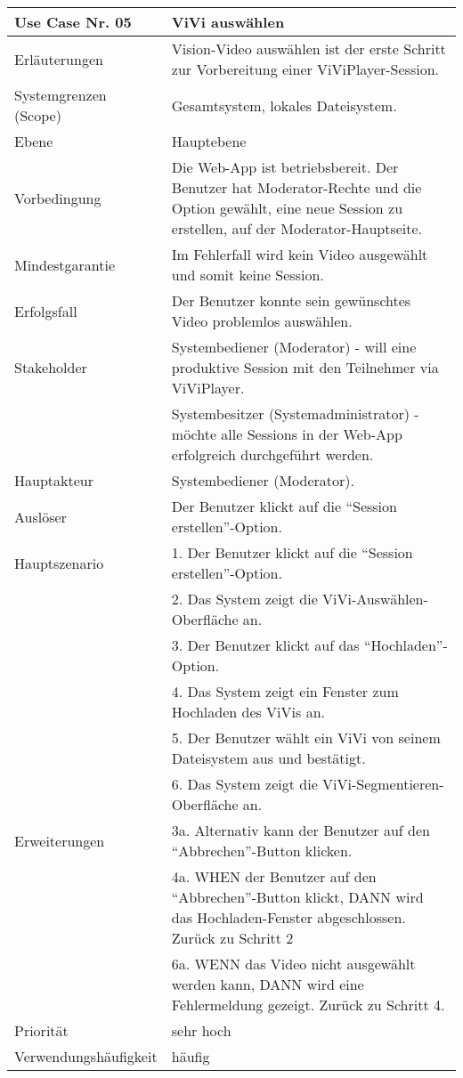 \begin{tabularx}{\linewidth}{|l|X|}
	\hline
	Use Case Nr. 05			& \textbf{ViVi auswählen} \\ \hline
	Erläuterungen			& Vision-Video auswählen ist der erste Schritt zur Vorbereitung 
							  einer ViViPlayer-Session. \\ \hline
	Systemgrenzen (Scope)	& Gesamtsystem, lokales Dateisystem. \\ \hline
	Ebene					& Hauptebene \\ \hline
	Vorbedingung			& Die Web-App ist betriebsbereit. Der Benutzer hat 
							  Moderator-Rechte und die Option gewählt, eine neue Session zu 
							  erstellen, auf der Moderator-Hauptseite. \\ \hline
	Mindestgarantie			& Im Fehlerfall wird kein Video ausgewählt und somit keine 
							  Session.\\ \hline
	Erfolgsfall 			& Der Benutzer konnte sein gewünschtes Video problemlos auswählen. 
							  \\ \hline
	Stakeholder				& Systembediener (Moderator) - will eine produktive Session mit den 
							  Teilnehmer via ViViPlayer. \\
							& Systembesitzer (Systemadministrator) - möchte alle Sessions in der 
							  Web-App erfolgreich durchgeführt werden. \\ \hline
	Hauptakteur				& Systembediener (Moderator). \\ \hline
	Auslöser				& Der Benutzer klickt auf die ``Session erstellen''-Option. \\ \hline	
	Hauptszenario			& 1. Der Benutzer klickt auf die ``Session erstellen''-Option. \\
							& 2. Das System zeigt die ViVi-Auswählen-Oberfläche an. \\
							& 3. Der Benutzer klickt auf das ``Hochladen''-Option. \\
							& 4. Das System zeigt ein Fenster zum Hochladen des ViVis an. \\
							& 5. Der Benutzer wählt ein ViVi von seinem Dateisystem aus und 
							  bestätigt. \\
							& 6. Das System zeigt die ViVi-Segmentieren-Oberfläche an. \\ \hline
	Erweiterungen			& 3a. Alternativ kann der Benutzer auf den ``Abbrechen''-Button klicken. \\
							& 4a. WHEN der Benutzer auf den ``Abbrechen''-Button klickt, DANN wird das 
							  Hochladen-Fenster abgeschlossen. Zurück zu Schritt 2  \\
							& 6a. WENN das Video nicht ausgewählt werden kann, DANN wird eine 
							  Fehlermeldung gezeigt. Zurück zu Schritt 4. \\ \hline
	Priorität				& sehr hoch \\ \hline
	Verwendungshäufigkeit	& häufig \\ \hline
\end{tabularx}